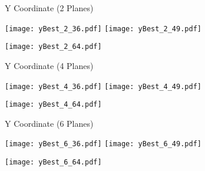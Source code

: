 \documentclass{beamer}
\begin{document}
\begin{frame}{Y Coordinate (2 Planes)}
\begin{adjustwidth}{-1.5em}{-1.5em}
	\texttt{[image: yBest\_2\_36.pdf]}
	\texttt{[image: yBest\_2\_49.pdf]} \\
	\begin{center} {\texttt{[image: yBest\_2\_64.pdf]}} \end{center}
\end{adjustwidth}
\end{frame}

\begin{frame}{Y Coordinate (4 Planes)}
\begin{adjustwidth}{-1.5em}{-1.5em}
	\texttt{[image: yBest\_4\_36.pdf]}
	\texttt{[image: yBest\_4\_49.pdf]} \\
	\begin{center} {\texttt{[image: yBest\_4\_64.pdf]}} \end{center}
\end{adjustwidth}
\end{frame}

\begin{frame}{Y Coordinate (6 Planes)}
\begin{adjustwidth}{-1.5em}{-1.5em}
	\texttt{[image: yBest\_6\_36.pdf]}
	\texttt{[image: yBest\_6\_49.pdf]} \\
	\begin{center} {\texttt{[image: yBest\_6\_64.pdf]}} \end{center}
\end{adjustwidth}
\end{frame}
\end{document}
